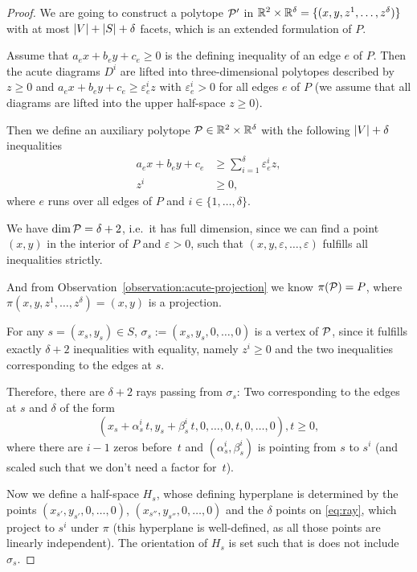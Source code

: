 \begin{proof}
  We are going to construct a polytope $\P'$ in $\R^2 \times \R^{\delta} = \{(x,y,z^1,\dots,z^{\delta})\}$ with at most $\abs{V}+\abs{S}+\delta$ facets, which is an extended formulation of $P$.

  Assume that $a_e x + b_e y + c_e \geq 0$ is the defining inequality of an edge $e$ of $P$. Then the acute diagrams $D^i$ are lifted into three-dimensional polytopes described by $z \geq 0$ and $a_e x + b_e y + c_e \geq \varepsilon_e^i z$ with $\varepsilon_e^i > 0$ for all edges $e$ of $P$ (we assume that all diagrams are lifted into the upper half-space $z \geq 0$).

  Then we define an auxiliary polytope $\P \in \R^2 \times \R^{\delta}$ with the following $\abs{V}+\delta$ inequalities 
  \begin{align*}
    a_e x + b_e y + c_e &\geq \sum_{i=1}^{\delta} \varepsilon_e^i z,\\
    z^i &\geq 0,
  \end{align*}
  where $e$ runs over all edges of $P$ and $i \in \{1,\dots,\delta\}$.

  We have $\dim \P = \delta + 2$, i.e.\ it has full dimension, since we can find a point $(x,y)$ in the interior of $P$ and $\varepsilon > 0$, such that $(x,y,\varepsilon,\dots,\varepsilon)$ fulfills all inequalities strictly.

  And from Observation~\ref{observation:acute-projection} we know $\pi(\P)=P$, where $\pi(x,y,z^1,\dots,z^{\delta}) = (x,y)$ is a projection.

  For any $s = (x_s, y_s) \in S$, $\sigma_s := (x_s,y_s,0,\dots,0)$ is a vertex of $\P$, since it fulfills exactly $\delta + 2$ inequalities with equality, namely $z^i \geq 0$ and the two inequalities corresponding to the edges at $s$.

  Therefore, there are $\delta + 2$ rays passing from $\sigma_s$: Two corresponding to the edges at $s$ and $\delta$ of the form
  \begin{equation}\label{eq:ray}
    (x_s + \alpha_s^i\,t,y_s + \beta_s^i\,t,0,\dots,0,t,0,\dots,0), t \geq 0,
  \end{equation}
  where there are $i-1$ zeros before~$t$ and $(\alpha_s^i, \beta_s^i)$ is pointing from $s$ to $s^i$ (and scaled such that we don't need a factor for~$t$).

  Now we define a half-space $H_s$, whose defining hyperplane is determined by the points $(x_{s'},y_{s'},0,\dots,0)$, $(x_{s''},y_{s''},0,\dots,0)$ and the $\delta$ points on \eqref{eq:ray}, which project to $s^i$ under $\pi$ (this hyperplane is well-defined, as all those points are linearly independent). The orientation of $H_s$ is set such that is does not include $\sigma_s$.


\end{proof}
